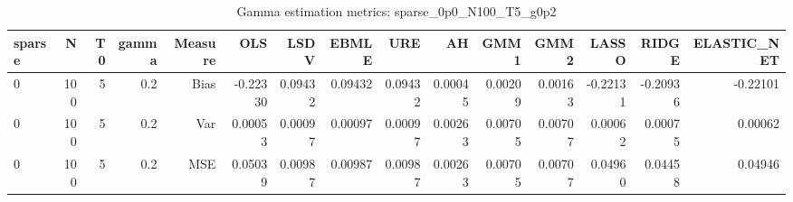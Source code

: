 \begin{table}[!htbp]\centering
\caption{Gamma estimation metrics: sparse_0p0_N100_T5_g0p2}
\label{tab:table1_sparse_0p0_N100_T5_g0p2}
\begin{tabular}{lrrrrrrrrrrrrrr}
\hline
sparse & N & T0 & gamma & Measure & OLS & LSDV & EBMLE & URE & AH & GMM1 & GMM2 & LASSO & RIDGE & ELASTIC_NET \\
\hline
0 & 100 & 5 & 0.2 & Bias & -0.22330 & 0.09432 & 0.09432 & 0.09432 & 0.00045 & 0.00209 & 0.00163 & -0.22131 & -0.20936 & -0.22101 \\
0 & 100 & 5 & 0.2 & Var & 0.00053 & 0.00097 & 0.00097 & 0.00097 & 0.00263 & 0.00705 & 0.00707 & 0.00062 & 0.00075 & 0.00062 \\
0 & 100 & 5 & 0.2 & MSE & 0.05039 & 0.00987 & 0.00987 & 0.00987 & 0.00263 & 0.00705 & 0.00707 & 0.04960 & 0.04458 & 0.04946 \\
\hline
\end{tabular}
\end{table}

